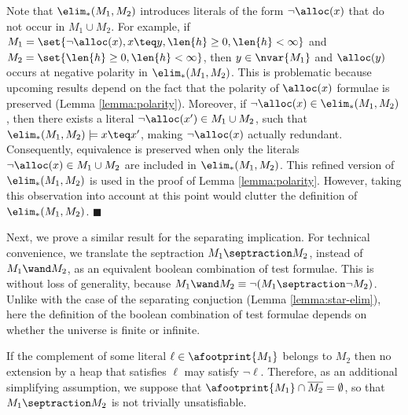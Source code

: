\begin{remark}\label{rem:star-elim-alloc}
Note that $\elim_*(M_1,M_2)$ introduces literals of the form
$\neg\alloc(x)$ that do not occur in $M_1 \cup M_2$. For example, if
$M_1 = \set{\neg\alloc(x), x \teq y, \len{h} \geq 0, \len{h} <
  \infty}$ and $M_2 = \set{\len{h} \geq 0, \len{h} < \infty}$, then $y
\in \nvar{M_1}$ and $\alloc(y)$ occurs at negative polarity in
$\elim_*(M_1,M_2)$. This is problematic because upcoming results
depend on the fact that the polarity of $\alloc(x)$ formulae is
preserved (Lemma \ref{lemma:polarity}). Moreover, if $\neg \alloc(x)
\in \elim_*(M_1,M_2)$, then there exists a literal $\neg\alloc(x') \in
M_1 \cup M_2$, such that $\elim_*(M_1,M_2) \models x \teq x'$, making
$\neg \alloc(x)$ actually redundant. Consequently, equivalence is
preserved when only the literals $\neg\alloc(x) \in M_1 \cup M_2$ are
included in $\elim_*(M_1,M_2)$. This refined version of
$\elim_*(M_1,M_2)$ is used in the proof of Lemma
\ref{lemma:polarity}. However, taking this observation into account at
this point would clutter the definition of $\elim_*(M_1,M_2)$.
\hfill$\blacksquare$
\end{remark}

Next, we prove a similar result for the separating implication. For
technical convenience, we translate the septraction $M_1 \septraction
M_2$, instead of $M_1 \wand M_2$, as an equivalent boolean combination
of test formulae. This is without loss of generality, because $M_1
\wand M_2 \equiv \neg(M_1 \septraction \neg M_2)$. Unlike with the
case of the separating conjuction (Lemma \ref{lemma:star-elim}), here
the definition of the boolean combination of test formulae depends on
whether the universe is finite or infinite. 

If the complement of some literal $\ell \in \afootprint{M_1}$ belongs
to $M_2$ then no extension by a heap that satisfies $\ell$ may satisfy
$\neg\ell$. Therefore, as an additional simplifying assumption, we
suppose that \(\afootprint{M_1} \cap \overline{M_2} = \emptyset\),
so that $M_1 \septraction M_2$ is not trivially unsatisfiable.

